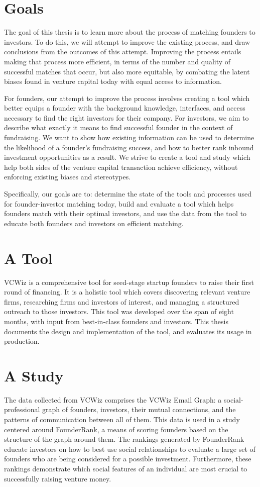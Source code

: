\section{Goals}

The goal of this thesis is to learn more about the process of matching founders to investors. To do this, we will attempt to improve the existing process, and draw conclusions from the outcomes of this attempt. Improving the process entails making that process more efficient, in terms of the number and quality of successful matches that occur, but also more equitable, by combating the latent biases found in venture capital today with equal access to information.

For founders, our attempt to improve the process involves creating a tool which better equips a founder with the background knowledge, interfaces, and access necessary to find the right investors for their company. For investors, we aim to describe what exactly it means to find successful founder in the context of fundraising. We want to show how existing information can be used to determine the likelihood of a founder's fundraising success, and how to better rank inbound investment opportunities as a result. We strive to create a tool and study which help both sides of the venture capital transaction achieve efficiency, without enforcing existing biases and stereotypes.

Specifically, our goals are to: determine the state of the tools and processes used for founder-investor matching today, build and evaluate a tool which helps founders match with their optimal investors, and use the data from the tool to educate both founders and investors on efficient matching.

\section{A Tool}

VCWiz is a comprehensive tool for seed-stage startup founders to raise their first round of financing. It is a holistic tool which covers discovering relevant venture firms, researching firms and investors of interest, and managing a structured outreach to those investors. This tool was developed over the span of eight months, with input from best-in-class founders and investors. This thesis documents the design and implementation of the tool, and evaluates its usage in production.

\section{A Study}

The data collected from VCWiz comprises the VCWiz Email Graph: a social-professional graph of founders, investors, their mutual connections, and the patterns of communication between all of them. This data is used in a study centered around FounderRank, a means of scoring founders based on the structure of the graph around them. The rankings generated by FounderRank educate investors on how to best use social relationships to evaluate a large set of founders who are being considered for a possible investment. Furthermore, these rankings demonstrate which social features of an individual are most crucial to successfully raising venture money.

